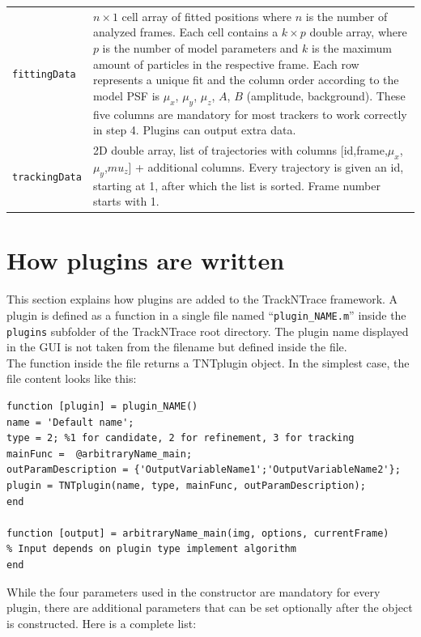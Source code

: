 \documentclass[11pt,onside]{report}
\numberwithin{equation}{chapter}
\begin{document}
\begin{table}[!h]
\begin{tabular}{p{} p{}}
\texttt{fittingData} & $n\times 1$ cell array of fitted positions where $n$ is the number of analyzed frames. Each cell contains a $k\times p$ double array, where $p$ is the number of model parameters and $k$ is the maximum amount of particles in the respective frame. Each row represents a unique fit and the column order according to the model PSF is $\mu_x$, $\mu_y$, $\mu_z$, $A$, $B$ (amplitude, background). These five columns are mandatory for most trackers to work correctly in step 4. Plugins can output extra data.\\
\texttt{trackingData} & 2D double array, list of trajectories with columns  [id,frame,$\mu_x$,$\mu_y$,$mu_z$] + additional columns. Every trajectory is given an id, starting at 1, after which the list is sorted. Frame number starts with 1.\\
\bottomrule
\end{tabular}
\end{table}

\clearpage

\section{How plugins are written}\label{sec:howto_plugins}
This section explains how plugins are added to the TrackNTrace framework. A plugin is defined as a function in a single file named ``\texttt{plugin\_NAME.m}'' inside the \texttt{plugins} subfolder of the TrackNTrace root directory. The plugin name displayed in the GUI is not taken from the filename but defined inside the file.\\

The function inside the file returns a TNTplugin object. In the simplest case, the file content looks like this:
\begin{lstlisting}[style=Matlab-editor]
function [plugin] = plugin_NAME()
name = 'Default name';
type = 2; %1 for candidate, 2 for refinement, 3 for tracking
mainFunc =  @arbitraryName_main;
outParamDescription = {'OutputVariableName1';'OutputVariableName2'};
plugin = TNTplugin(name, type, mainFunc, outParamDescription);
end

function [output] = arbitraryName_main(img, options, currentFrame) 
% Input depends on plugin type implement algorithm
end
\end{lstlisting}

While the four parameters used in the constructor are mandatory for every plugin, there are additional parameters that can be set optionally after the object is constructed. Here is a complete list:
\end{document}
